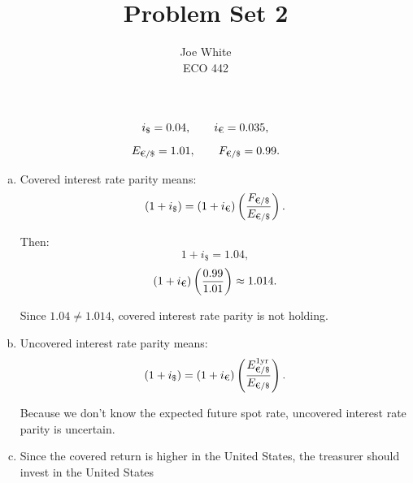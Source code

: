 \documentclass[11pt]{article}
\newenvironment{problem}[2][Problem]{\begin{trivlist}
\item[\hskip \labelsep {\bfseries #1}\hskip \labelsep {\bfseries #2.}]
\leavevmode\par
}{\end{trivlist}}
\begin{document}
\title{Problem Set 2}
\author{Joe White\\ECO 442}
\maketitle

\begin{problem}{1}

\[
i_{\$} = 0.04, \qquad i_{\text{\texteuro}} = 0.035,
\]
\[
E_{\text{\texteuro}/\$} = 1.01, \qquad F_{\text{\texteuro}/\$} = 0.99.
\]

\begin{enumerate}[(a)]
\item Covered interest rate parity means:
\[
(1+i_{\$})
= (1+i_{\text{\texteuro}})
\left(\frac{F_{\text{\texteuro}/\$}}{E_{\text{\texteuro}/\$}}\right).
\]

Then:
\[
1+i_{\$} = 1.04,
\]
\[
(1+i_{\text{\texteuro}})
\left(\frac{0.99}{1.01}\right)
\approx 1.014.
\]

Since $1.04 \neq 1.014$, covered interest rate parity is not holding.

\item Uncovered interest rate parity means:
\[
(1+i_{\$})
= (1+i_{\text{\texteuro}})
\left(\frac{E^{1\text{yr}}_{\text{\texteuro}/\$}}{E_{\text{\texteuro}/\$}}\right).
\]

Because we don't know the expected future spot rate, uncovered interest rate parity is uncertain.

\item Since the covered return is higher in the United States, the treasurer should invest in the United States
\end{enumerate}

\end{problem}
\end{document}
